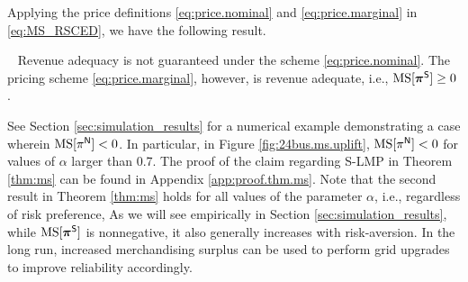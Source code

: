 Applying the price definitions \eqref{eq:price.nominal} and \eqref{eq:price.marginal} in \eqref{eq:MS_RSCED}, we have the following result.

\begin{theorem}
  \label{thm:ms}~
          Revenue adequacy is not guaranteed under the \LMPnom{} scheme \eqref{eq:price.nominal}. 
      The \LMPmar{} pricing scheme \eqref{eq:price.marginal}, however, is revenue adequate, i.e., ${\rm MS}{}[{\bm{\pi}}^{{\sf S}}] \ge 0$.
\end{theorem}
See Section \ref{sec:simulation_results} for a numerical example demonstrating a case wherein ${\rm MS}[\pi^{{\sf N}}]<0$. In particular, in Figure \ref{fig:24bus.ms.uplift}, ${\rm MS}[\pi^{{\sf N}}]<0$ for values of $\alpha$ larger than 0.7.
The proof of the claim regarding S-LMP in Theorem \ref{thm:ms} can be found in Appendix \ref{app:proof.thm.ms}. 
Note that the second result in Theorem \ref{thm:ms} holds for all values of the \CVaR{} parameter $\alpha$, i.e., regardless of risk preference, 
As we will see empirically in Section \ref{sec:simulation_results}, while ${\rm MS}{}[{\bm{\pi}}^{{\sf S}}]$ is nonnegative, it also generally increases with risk-aversion. 
In the long run, increased merchandising surplus can be used to perform grid upgrades to improve reliability accordingly. 

